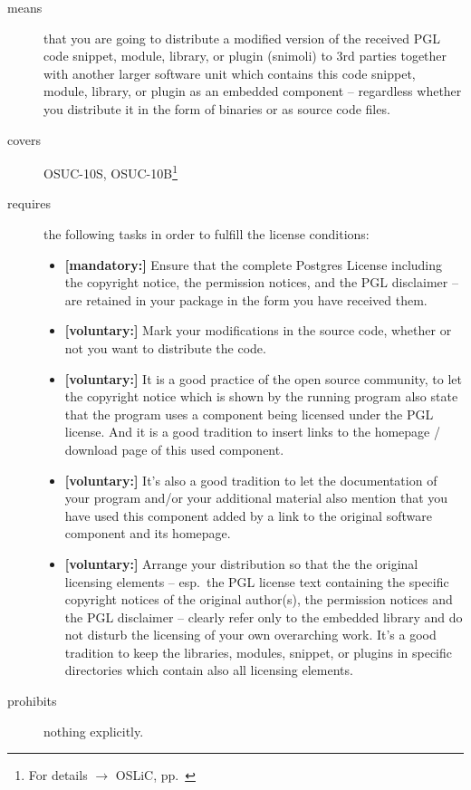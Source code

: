 \begin{description}

\item[means] that you are going to distribute a modified version of the received
PGL code snippet, module, library, or plugin (snimoli) to 3rd parties together
with another larger software unit which contains this code snippet, module,
library, or plugin as an embedded component -- regardless whether you distribute
it in the form of binaries or as source code files.

\item[covers] OSUC-10S, OSUC-10B\footnote{For details $\rightarrow$ OSLiC, pp.\
\pageref{OSUC-10S-DEF}}

\item[requires] the following tasks in order to fulfill the license conditions:
\begin{itemize}
  \item \textbf{[mandatory:]} Ensure that the complete Postgres License
  including the copyright notice, the permission notices, and the PGL disclaimer
  -- are retained in your package in the form you have received them.

  \item \textbf{[voluntary:]} Mark your modifications in the source code,
  whether or not you want to distribute the code.
  
  \item \textbf{[voluntary:]} It is a good practice of the open source
  community, to let the copyright notice which is shown by the running program
  also state that the program uses a component being licensed under the PGL
  license. And it is a good tradition to insert links to the homepage / download
  page of this used component.

  \item \textbf{[voluntary:]} It's also a good tradition to let the
  documentation of your program and/or your additional material also mention
  that you have used this component added by a link to the original software
  component and its homepage.
  
  \item \textbf{[voluntary:]} Arrange your distribution so that the the original
  licensing elements -- esp.\ the PGL license text containing the specific
  copyright notices of the original author(s), the permission notices and the
  PGL disclaimer --  clearly refer only to the embedded library and do not
  disturb the licensing of your own overarching work. It's a good tradition to
  keep the libraries, modules, snippet, or plugins in specific directories which
  contain also all licensing elements.
  
\end{itemize}

\item[prohibits] nothing explicitly.

\end{description}

